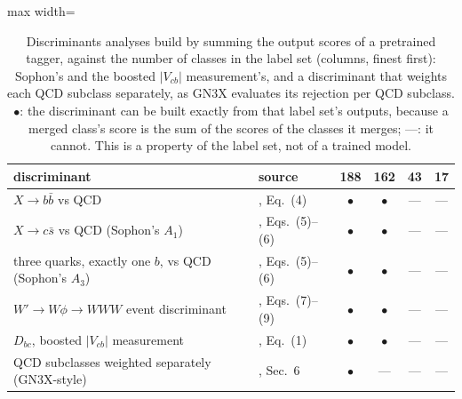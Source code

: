 \begin{table}[t]
\centering
\small
\setlength{\tabcolsep}{4pt}
\caption{Discriminants analyses build by summing the output scores of a pretrained tagger, against the number of classes in the label set (columns, finest first): Sophon's and the boosted $|V_{cb}|$ measurement's, and a discriminant that weights each QCD subclass separately, as GN3X evaluates its rejection per QCD subclass. $\bullet$: the discriminant can be built exactly from that label set's outputs, because a merged class's score is the sum of the scores of the classes it merges; ---: it cannot. This is a property of the label set, not of a trained model.}
\label{tab:usecase}
\begin{adjustbox}{max width=\linewidth}
\begin{tabular}{l l cccc}
\toprule
discriminant & source & 188 & 162 & 43 & 17 \\
\midrule
$X\to b\bar b$ vs QCD & \cite{sophon}, Eq.~(4) & $\bullet$ & $\bullet$ & --- & --- \\
$X\to c\bar s$ vs QCD (Sophon's $A_1$) & \cite{sophon}, Eqs.~(5)--(6) & $\bullet$ & $\bullet$ & --- & --- \\
three quarks, exactly one $b$, vs QCD (Sophon's $A_3$) & \cite{sophon}, Eqs.~(5)--(6) & $\bullet$ & $\bullet$ & --- & --- \\
$W'\to W\phi\to WWW$ event discriminant & \cite{sophon}, Eqs.~(7)--(9) & $\bullet$ & $\bullet$ & --- & --- \\
$D_{bc}$, boosted $|V_{cb}|$ measurement & \cite{vcbboosted}, Eq.~(1) & $\bullet$ & $\bullet$ & --- & --- \\
QCD subclasses weighted separately (GN3X-style) & \cite{atlasgnx}, Sec.~6 & $\bullet$ & --- & --- & --- \\
\bottomrule
\end{tabular}
\end{adjustbox}
\end{table}
